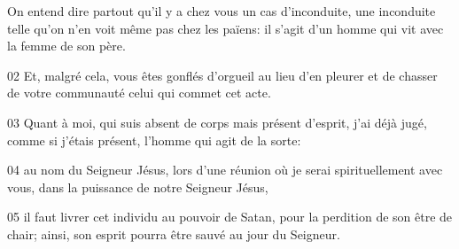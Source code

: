 On entend dire partout qu’il y a chez vous un cas d’inconduite, une inconduite telle qu’on n’en voit même pas chez les païens: il s’agit d’un homme qui vit avec la femme de son père.

02 Et, malgré cela, vous êtes gonflés d’orgueil au lieu d’en pleurer et de chasser de votre communauté celui qui commet cet acte.

03 Quant à moi, qui suis absent de corps mais présent d’esprit, j’ai déjà jugé, comme si j’étais présent, l’homme qui agit de la sorte:

04 au nom du Seigneur Jésus, lors d’une réunion où je serai spirituellement avec vous, dans la puissance de notre Seigneur Jésus,

05 il faut livrer cet individu au pouvoir de Satan, pour la perdition de son être de chair; ainsi, son esprit pourra être sauvé au jour du Seigneur.
